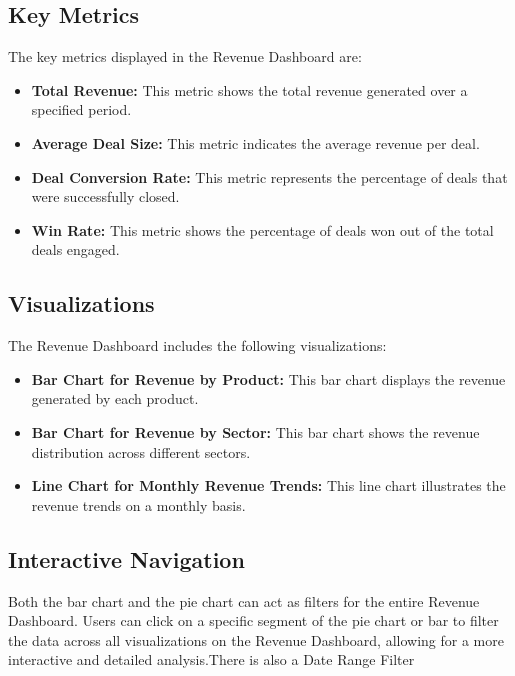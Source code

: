 \documentclass{article}
\begin{document}
\subsection{Key Metrics}
The key metrics displayed in the Revenue Dashboard are:
\begin{itemize}
    \item \textbf{Total Revenue:} This metric shows the total revenue generated over a specified period.
    \item \textbf{Average Deal Size:} This metric indicates the average revenue per deal.
    \item \textbf{Deal Conversion Rate:} This metric represents the percentage of deals that were successfully closed.
    \item \textbf{Win Rate:} This metric shows the percentage of deals won out of the total deals engaged.
\end{itemize}

\subsection{Visualizations}
The Revenue Dashboard includes the following visualizations:
\begin{itemize}
    \item \textbf{Bar Chart for Revenue by Product:} This bar chart displays the revenue generated by each product.
    \item \textbf{Bar Chart for Revenue by Sector:} This bar chart shows the revenue distribution across different sectors.
    \item \textbf{Line Chart for Monthly Revenue Trends:} This line chart illustrates the revenue trends on a monthly basis.
\end{itemize}


\subsection{Interactive Navigation}
Both the bar chart and the pie chart can act as filters for the entire Revenue Dashboard. Users can click on a specific segment of the pie chart or bar to filter the data across all visualizations on the Revenue Dashboard, allowing for a more interactive and detailed analysis.There is also a {Date Range Filter}
\end{document}
